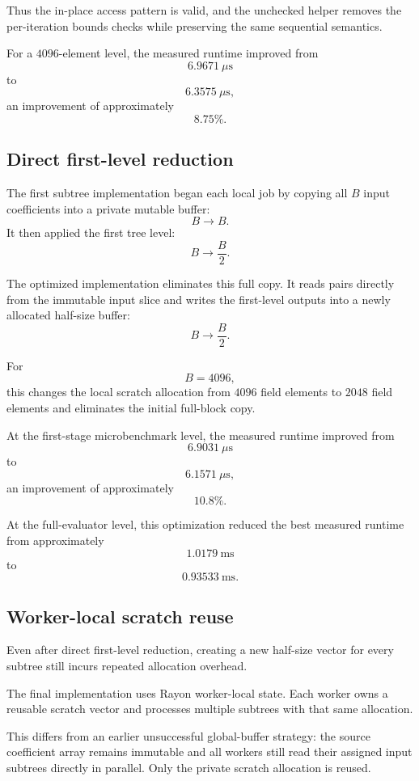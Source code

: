 Thus the in-place access pattern is valid, and the unchecked helper removes
the per-iteration bounds checks while preserving the same sequential
semantics.

For a \(4096\)-element level, the measured runtime improved from
\[
6.9671\ \mu\mathrm{s}
\]
to
\[
6.3575\ \mu\mathrm{s},
\]
an improvement of approximately
\[
8.75\%.
\]

\subsection{Direct first-level reduction}

The first subtree implementation began each local job by copying all
\(B\) input coefficients into a private mutable buffer:
\[
B
\longrightarrow
B.
\]
It then applied the first tree level:
\[
B
\longrightarrow
\frac{B}{2}.
\]

The optimized implementation eliminates this full copy.  It reads pairs
directly from the immutable input slice and writes the first-level outputs
into a newly allocated half-size buffer:
\[
\boxed{
B
\longrightarrow
\frac{B}{2}.
}
\]

For
\[
B=4096,
\]
this changes the local scratch allocation from \(4096\) field elements to
\(2048\) field elements and eliminates the initial full-block copy.

At the first-stage microbenchmark level, the measured runtime improved from
\[
6.9031\ \mu\mathrm{s}
\]
to
\[
6.1571\ \mu\mathrm{s},
\]
an improvement of approximately
\[
10.8\%.
\]

At the full-evaluator level, this optimization reduced the best measured
runtime from approximately
\[
1.0179\ \mathrm{ms}
\]
to
\[
0.93533\ \mathrm{ms}.
\]

\subsection{Worker-local scratch reuse}

Even after direct first-level reduction, creating a new half-size vector
for every subtree still incurs repeated allocation overhead.

The final implementation uses Rayon worker-local state.  Each worker owns
a reusable scratch vector and processes multiple subtrees with that same
allocation.

This differs from an earlier unsuccessful global-buffer strategy:
the source coefficient array remains immutable and all workers still read
their assigned input subtrees directly in parallel.  Only the private
scratch allocation is reused.

